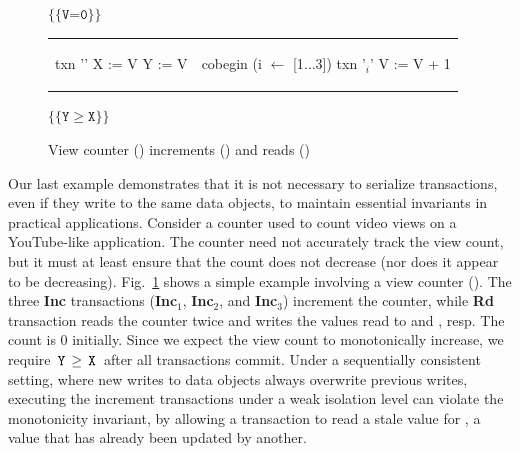 \begin{figure}[t]
\centering
\hspace*{-0.3in}$\{\{\texttt{V=0}\}\}$
\begin{tabular}{l||l}
\begin{txnimpcode}
  txn '\B{Rd}' {
    X := V
    Y := V
  }
\end{txnimpcode}
&
\begin{txnimpcode}
  cobegin (i $\leftarrow$ [1$\ldots$3]) {
    txn '\B{Inc}$_{i}$' {
      V := V + 1
    }
  }
\end{txnimpcode}
\\
\end{tabular}
\hspace*{-0.3in}$\{\{\texttt{Y}\ge\texttt{X}\}\}$

\caption{View counter () increments () and reads ()}
\label{fig:motiv-eg-4}
\end{figure}

Our last example demonstrates that it is not necessary to serialize
transactions, even if they write to the same data objects, to maintain
essential invariants in practical applications. Consider a counter
used to count video views on a YouTube-like application. The counter
need not accurately track the view count, but it must at least ensure
that the count does not decrease (nor does it appear to be
decreasing). Fig.~\ref{fig:motiv-eg-4} shows a simple example
involving a view counter (). The three {\bf Inc} transactions
({\bf Inc$_{1}$}, {\bf Inc$_{2}$}, and {\bf Inc$_{3}$}) increment the counter,
while {\bf Rd} transaction reads the counter twice and writes the
values read to  and , resp. The count is 0 initially. Since
we expect the view count to monotonically increase, we require
$\,{\tt Y}\,\ge\,{\tt X}\,$ after all transactions commit.  Under a sequentially
consistent setting, where new writes to data objects always overwrite
previous writes, executing the increment transactions under a weak
isolation level can violate the monotonicity invariant, by allowing a
transaction to read a stale value for , a value that has already
been updated by another.



